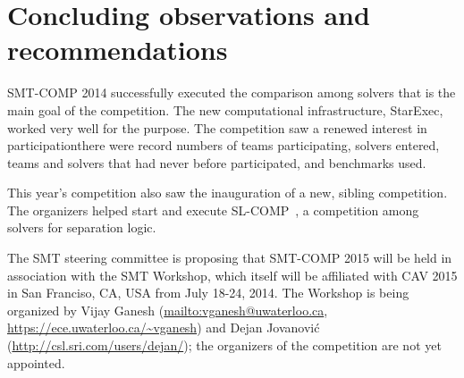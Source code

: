 \documentclass[twoside,11pt]{article}
\begin{document}
\section{Concluding observations and recommendations}
\label{sec:conclusions}

SMT-COMP 2014 successfully executed the comparison among solvers that is the main goal
of the competition. The new computational infrastructure, StarExec, worked very well for the purpose. The competition saw a renewed interest in participation\textemdash there were record numbers of teams participating, solvers entered, teams and solvers that had never before participated, and benchmarks used.

This year's competition also saw the inauguration of a new, sibling competition. The organizers helped start and execute SL-COMP~\cite{SLCOMP}, a competition among solvers for separation logic. 

The SMT steering committee is proposing that SMT-COMP 2015 will be held in association with the SMT Workshop, which itself will be affiliated with CAV 2015 in San Franciso, CA, USA from July 18-24, 2014.
The Workshop is being organized by 
Vijay Ganesh (\url{mailto:vganesh@uwaterloo.ca}, \url{https://ece.uwaterloo.ca/~vganesh}) and
Dejan Jovanovi\'c (\url{http://csl.sri.com/users/dejan/}); the organizers of the competition are not yet appointed.
\end{document}
